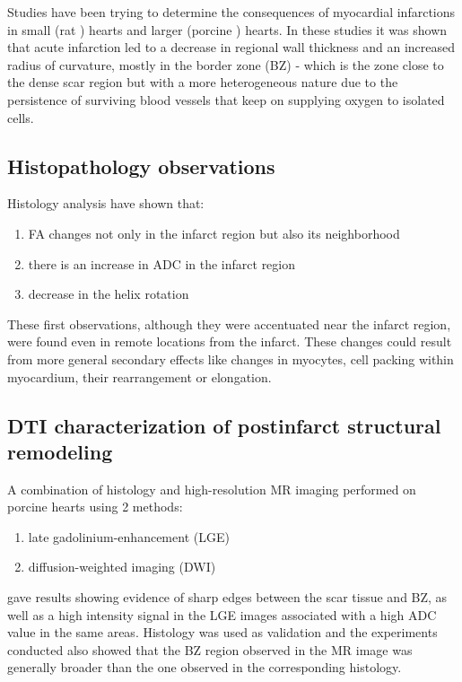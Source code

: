 Studies have been trying to determine the consequences of myocardial infarctions in small (rat \cite{weisman1985global}) hearts and larger (porcine \cite{wu2007mr, mediamihaela}) hearts. In these studies it was shown that acute infarction led to a decrease in regional wall thickness and an increased radius of curvature, mostly in the border zone (BZ) - which is the zone close to the dense scar region but with a more heterogeneous nature due to the persistence of surviving blood vessels that keep on supplying oxygen to isolated cells.

\subsection{Histopathology observations}

Histology analysis have shown that:
\begin{enumerate}
    \item FA changes not only in the infarct region but also its neighborhood
    \item there is an increase in ADC in the infarct region
    \item decrease in the helix rotation
\end{enumerate}
These first observations, although they were accentuated near the infarct region, were found even in remote locations from the infarct. These changes could result from more general secondary effects like changes in myocytes, cell packing within myocardium, their rearrangement or elongation.

\subsection{DTI characterization of postinfarct structural remodeling}

A combination of histology and high-resolution MR imaging performed on porcine hearts \cite{pmbpop2013quantification} using 2 methods:
\begin{enumerate}
    \item late gadolinium-enhancement (LGE)
    \item diffusion-weighted imaging (DWI)
\end{enumerate}
gave results showing evidence of sharp edges between the scar tissue and BZ, as well as a high intensity signal in the LGE images associated with a high ADC value in the same areas. Histology was used as validation and the experiments conducted also showed that the BZ region observed in the MR image was generally broader than the one observed in the corresponding histology.